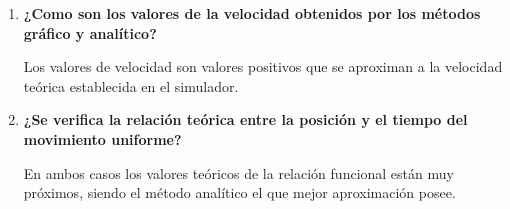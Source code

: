 \documentclass[letter,11pt]{article}
\begin{document}
\begin{enumerate}
\item \textbf{¿Como son los valores de la velocidad obtenidos por los métodos
    gráfico y analítico?}

Los valores de velocidad son valores positivos que se aproximan a la velocidad
teórica establecida en el simulador.

\item \textbf{¿Se verifica la relación teórica entre la posición y el tiempo del
    movimiento uniforme?}

En ambos casos los valores teóricos de la relación funcional están muy próximos,
siendo el método analítico el que mejor aproximación posee.

\end{enumerate}
\end{document}
